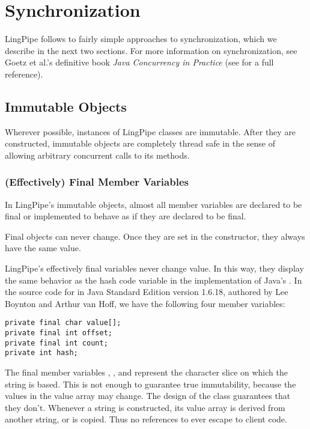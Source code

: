 \section{Synchronization}

LingPipe follows to fairly simple approaches to synchronization, which
we describe in the next two sections.  For more information on
synchronization, see Goetz et al.'s definitive book {\it Java
  Concurrency in Practice} (see  for a full
reference).

\subsection{Immutable Objects}

Wherever possible, instances of LingPipe classes are immutable.  After
they are constructed, immutable objects are completely thread safe in
the sense of allowing arbitrary concurrent calls to its methods.

\subsubsection{(Effectively) Final Member Variables}

In LingPipe's immutable objects, almost all member variables are
declared to be final or implemented to behave as if they are declared
to be final.  

Final objects can never change.  Once they are set in the constructor,
they always have the same value.

LingPipe's effectively final variables never change value.  In this
way, they display the same behavior as the hash code variable in the
implementation of Java's .  In the source code for
 in Java Standard Edition version 1.6.18,
authored by Lee Boynton and Arthur van Hoff, we have the following
four member variables:
%
\begin{verbatim}
private final char value[];
private final int offset;
private final int count;
private int hash;
\end{verbatim}
%
The final member variables , , and
 represent the character slice on which the string is
based.  This is not enough to guarantee true immutability, because the
values in the value array may change.  The design of the 
class guarantees that they don't.  Whenever a string is constructed,
its value array is derived from another string, or is copied.  Thus no
references to  ever escape to client code.

